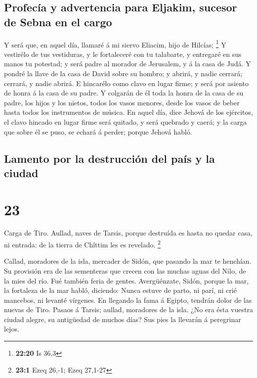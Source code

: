 \hypertarget{profecuxeda-y-advertencia-para-eljakim-sucesor-de-sebna-en-el-cargo}{%
\subsection{Profecía y advertencia para Eljakim, sucesor de Sebna en el
cargo}\label{profecuxeda-y-advertencia-para-eljakim-sucesor-de-sebna-en-el-cargo}}

 Y será que, en aquel día, llamaré á mi siervo Eliacim,
hijo de Hilcías; \footnote{\textbf{22:20} Is 36,3}  Y
vestirélo de tus vestiduras, y le fortaleceré con tu talabarte, y
entregaré en sus manos tu potestad; y será padre al morador de
Jerusalem, y á la casa de Judá.  Y pondré la llave de la
casa de David sobre su hombro; y abrirá, y nadie cerrará; cerrará, y
nadie abrirá.  E hincarélo como clavo en lugar firme; y
será por asiento de honra á la casa de su padre.  Y
colgarán de él toda la honra de la casa de su padre, los hijos y los
nietos, todos los vasos menores, desde los vasos de beber hasta todos
los instrumentos de música.  En aquel día, dice Jehová de
los ejércitos, el clavo hincado en lugar firme será quitado, y será
quebrado y caerá; y la carga que sobre él se puso, se echará á perder;
porque Jehová habló.

\hypertarget{lamento-por-la-destrucciuxf3n-del-pauxeds-y-la-ciudad}{%
\subsection{Lamento por la destrucción del país y la
ciudad}\label{lamento-por-la-destrucciuxf3n-del-pauxeds-y-la-ciudad}}

\hypertarget{section-22}{%
\section{23}\label{section-22}}

 Carga de Tiro. Aullad, naves de Tarsis, porque destruída
es hasta no quedar casa, ni entrada: de la tierra de Chîttim les es
revelado. \footnote{\textbf{23:1} Ezeq 26,-1; Ezeq 27,1-27}

 Callad, moradores de la isla, mercader de Sidón, que
pasando la mar te henchían.  Su provisión era de las
sementeras que crecen con las muchas aguas del Nilo, de la mies del río.
Fué también feria de gentes.  Avergüénzate, Sidón, porque
la mar, la fortaleza de la mar habló, diciendo: Nunca estuve de parto,
ni parí, ni crié mancebos, ni levanté vírgenes.  En
llegando la fama á Egipto, tendrán dolor de las nuevas de Tiro.
 Pasaos á Tarsis; aullad, moradores de la isla.
 ¿No era ésta vuestra ciudad alegre, su antigüedad de
muchos días? Sus pies la llevarán á peregrinar lejos.

